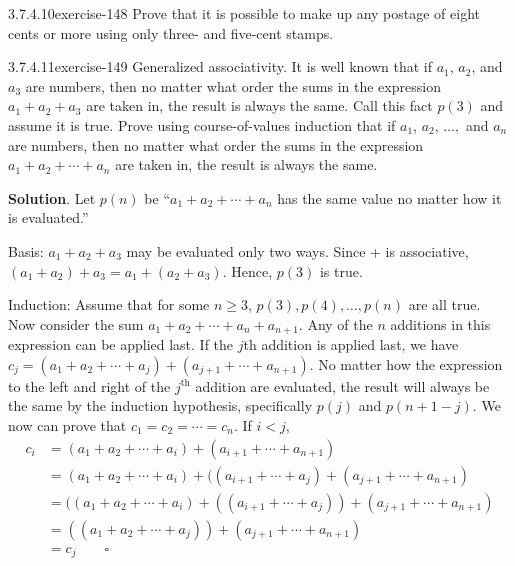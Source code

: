 \documentclass[twoside,10pt,]{book}
\numberwithin{equation}{section}
\begin{document}
\begin{divisionsolution}{3.7.4.10}{}{exercise-148}%
\hypertarget{p-1365}{}%
Prove that it is possible to make up any postage of eight cents or more using only three- and five-cent stamps.%
\end{divisionsolution}%
\begin{divisionsolution}{3.7.4.11}{}{exercise-149}%
\hypertarget{p-1366}{}%
Generalized associativity. It is well known that if \(a_1\), \(a_2\), and \(a_3\) are numbers, then no matter what order the sums in the expression \(a_1+ a_2+a_3\) are taken in, the result is always the same. Call this fact \(p(3)\) and assume it is true. Prove using course-of-values induction that if \(a_1\), \(a_2\), \(\ldots ,\) and \(a_n\)  are numbers, then no matter what order the sums in the expression \(a_1+ a_2+\cdots +a_n\) are taken in, the result is always the same.%
\par\smallskip%
\noindent\textbf{Solution}.\quad%
\hypertarget{p-1367}{}%
Let \(p(n)\) be ``\(a_{1} + a_2 + \cdots + a_n\) has the same value no matter how it is evaluated.''%
\par
\hypertarget{p-1368}{}%
Basis: \(a_1 + a_2 + a_3\) may be evaluated only two ways. Since + is associative, \((a_1 + a_2) + a_3 = a_1 + (a_2 + a_3)\). Hence, \(p(3)\) is true.%
\par
\hypertarget{p-1369}{}%
Induction: Assume that for some \(n\geq 3\), \(p(3), p(4), \dots , p(n)\) are all true. Now consider the sum \(a_1 + a_2 + \cdots + a_n + a_{n+1}\). Any of the \(n\) additions in this expression can be applied last. If the \(j\)th addition is applied last, we have \(c_j=(a_1+a_2+\cdots +a_j)+(a_{j+1}+\cdots +a_{n+1})\). No matter how the expression to the left and right of the \(j^{\text{th}}\) addition are evaluated, the result will always be the same by the induction hypothesis, specifically \(p(j)\) and \(p(n+1-j)\). We now can prove that \(c_1=c_2=\cdots =c_n\). If \(i < j\),%
\begin{equation*}
\begin{split}
c_i &=(a_1+a_2+\cdots +a_i)+(a_{i+1}+\cdots +a_{n+1})\\
&=(a_1+a_2+\cdots +a_i)+((a_{i+1}+\cdots +a_j)+(a_{j+1}+\cdots +a_{n+1})\\
&=((a_1+a_2+\cdots +a_i)+((a_{i+1}+\cdots +a_j))+(a_{j+1}+\cdots +a_{n+1})\\
&=((a_1+a_2+\cdots +a_j))+(a_{j+1}+\cdots +a_{n+1})\\
&=c_j \quad\quad \square
\end{split}
\end{equation*}
%
\end{divisionsolution}%
\end{document}

